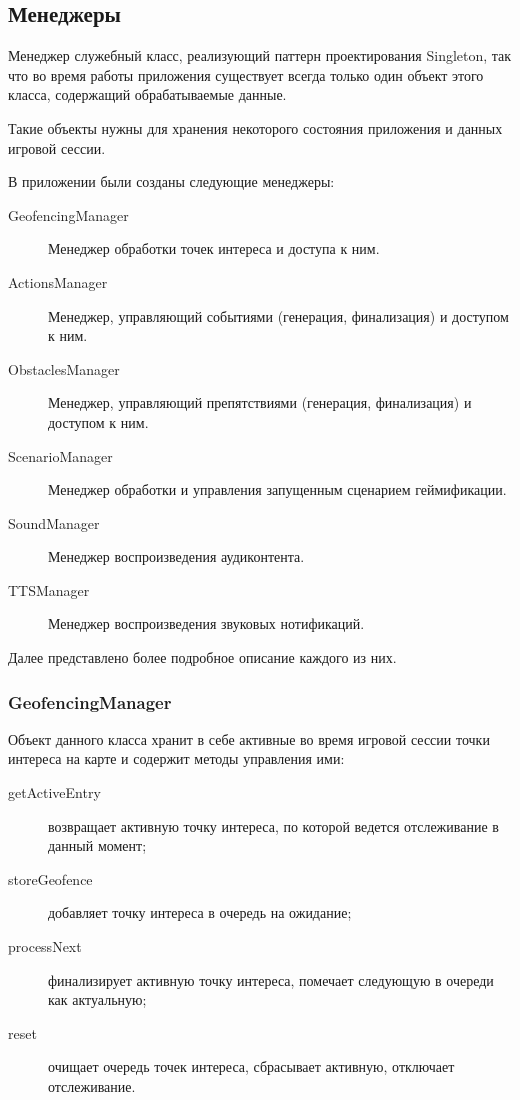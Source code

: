 \subsection*{Менеджеры}
Менеджер \textemdash\space служебный класс, реализующий паттерн проектирования Singleton, так что во время работы приложения существует всегда только один объект этого класса, содержащий обрабатываемые данные.

Такие объекты нужны для хранения некоторого состояния приложения и данных игровой сессии.

В приложении были созданы следующие менеджеры:
\begin{description}
	\item[GeofencingManager] Менеджер обработки точек интереса и доступа к ним.
	\item[ActionsManager] Менеджер, управляющий событиями (генерация, финализация) и доступом к ним.
	\item[ObstaclesManager] Менеджер, управляющий препятствиями (генерация, финализация) и доступом к ним.
	\item[ScenarioManager] Менеджер обработки и управления запущенным сценарием геймификации.
	\item[SoundManager] Менеджер воспроизведения аудиконтента.
	\item[TTSManager] Менеджер воспроизведения звуковых нотификаций.
\end{description}
\smallskip
Далее представлено более подробное описание каждого из них.

\subsubsection*{GeofencingManager}
\label{subsubsec:geofencing_manager}
Объект данного класса хранит в себе активные во время игровой сессии точки интереса на карте и содержит методы управления ими:
\begin{description}
	\item[getActiveEntry] возвращает активную точку интереса, по которой ведется отслеживание в данный момент;
	\item[storeGeofence] добавляет точку интереса в очередь на ожидание;
	\item[processNext] финализирует активную точку интереса, помечает следующую в очереди как актуальную;
	\item[reset] очищает очередь точек интереса, сбрасывает активную, отключает отслеживание.
\end{description}

